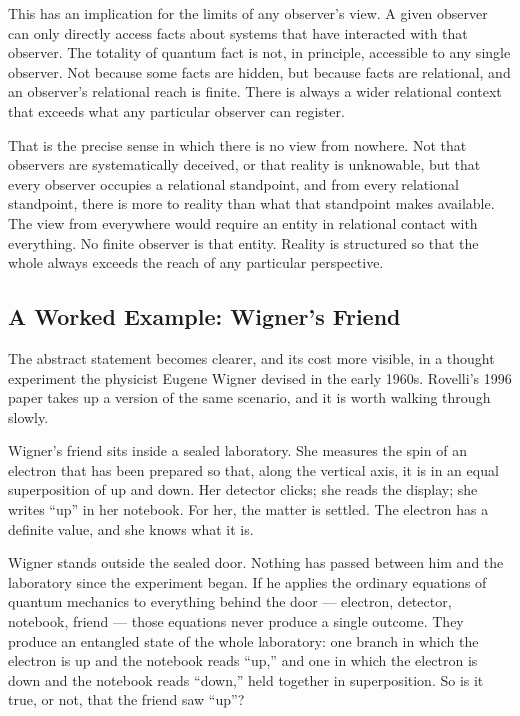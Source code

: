 This has an implication for the limits of any observer's view.
A given observer can only directly access facts about systems that have interacted with that observer.
The totality of quantum fact is not, in principle, accessible to any single observer.
Not because some facts are hidden, but because facts are relational, and an observer's relational reach is finite.
There is always a wider relational context that exceeds what any particular observer can register.

That is the precise sense in which there is no view from nowhere.
Not that observers are systematically deceived, or that reality is unknowable, but that every observer occupies a relational standpoint, and from every relational standpoint, there is more to reality than what that standpoint makes available.
The view from everywhere would require an entity in relational contact with everything.
No finite observer is that entity.
Reality is structured so that the whole always exceeds the reach of any particular perspective.

\subsection{A Worked Example: Wigner's Friend}

The abstract statement becomes clearer, and its cost more visible, in a thought experiment the physicist Eugene Wigner devised in the early 1960s.
Rovelli's 1996 paper takes up a version of the same scenario, and it is worth walking through slowly.

Wigner's friend sits inside a sealed laboratory.
She measures the spin of an electron that has been prepared so that, along the vertical axis, it is in an equal superposition of up and down.
Her detector clicks; she reads the display; she writes ``up'' in her notebook.
For her, the matter is settled.
The electron has a definite value, and she knows what it is.

Wigner stands outside the sealed door.
Nothing has passed between him and the laboratory since the experiment began.
If he applies the ordinary equations of quantum mechanics to everything behind the door --- electron, detector, notebook, friend --- those equations never produce a single outcome.
They produce an entangled state of the whole laboratory: one branch in which the electron is up and the notebook reads ``up,'' and one in which the electron is down and the notebook reads ``down,'' held together in superposition.
So is it true, or not, that the friend saw ``up''?


